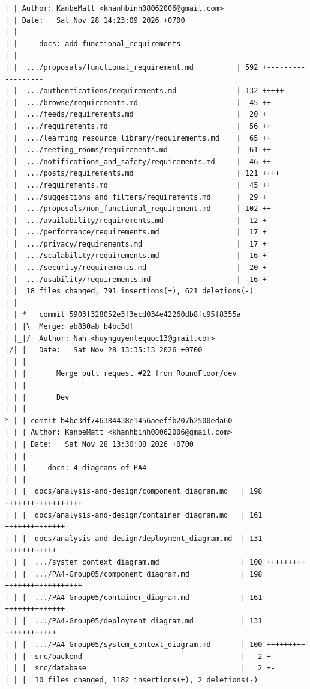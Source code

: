 \documentclass[12pt]{article}
\begin{document}
\begin{lstlisting}[numbers=none,breaklines=true]
| | Author: KanbeMatt <khanhbinh08062006@gmail.com>
| | Date:   Sat Nov 28 14:23:09 2026 +0700
| |
| |     docs: add functional_requirements
| |
| |  .../proposals/functional_requirement.md          | 592 +------------------
| |  .../authentications/requirements.md              | 132 +++++
| |  .../browse/requirements.md                       |  45 ++
| |  .../feeds/requirements.md                        |  20 +
| |  .../requirements.md                              |  56 ++
| |  .../learning_resource_library/requirements.md    |  65 ++
| |  .../meeting_rooms/requirements.md                |  61 ++
| |  .../notifications_and_safety/requirements.md     |  46 ++
| |  .../posts/requirements.md                        | 121 ++++
| |  .../requirements.md                              |  45 ++
| |  .../suggestions_and_filters/requirements.md      |  29 +
| |  .../proposals/non_functional_requirement.md      | 102 ++--
| |  .../availability/requirements.md                 |  12 +
| |  .../performance/requirements.md                  |  17 +
| |  .../privacy/requirements.md                      |  17 +
| |  .../scalability/requirements.md                  |  16 +
| |  .../security/requirements.md                     |  20 +
| |  .../usability/requirements.md                    |  16 +
| |  18 files changed, 791 insertions(+), 621 deletions(-)
| |
| | *   commit 5903f328052e3f3ecd034e42260db8fc95f8355a
| | |\  Merge: ab830ab b4bc3df
| |_|/  Author: Nah <huynguyenlequoc13@gmail.com>
|/| |   Date:   Sat Nov 28 13:35:13 2026 +0700
| | |
| | |       Merge pull request #22 from RoundFloor/dev
| | |
| | |       Dev
| | |
* | | commit b4bc3df746384438e1456aeeffb207b2500eda60
| | | Author: KanbeMatt <khanhbinh08062006@gmail.com>
| | | Date:   Sat Nov 28 13:30:08 2026 +0700
| | |
| | |     docs: 4 diagrams of PA4
| | |
| | |  docs/analysis-and-design/component_diagram.md   | 198 ++++++++++++++++++
| | |  docs/analysis-and-design/container_diagram.md   | 161 ++++++++++++++
| | |  docs/analysis-and-design/deployment_diagram.md  | 131 ++++++++++++
| | |  .../system_context_diagram.md                   | 100 +++++++++
| | |  .../PA4-Group05/component_diagram.md            | 198 ++++++++++++++++++
| | |  .../PA4-Group05/container_diagram.md            | 161 ++++++++++++++
| | |  .../PA4-Group05/deployment_diagram.md           | 131 ++++++++++++
| | |  .../PA4-Group05/system_context_diagram.md       | 100 +++++++++
| | |  src/backend                                     |   2 +-
| | |  src/database                                    |   2 +-
| | |  10 files changed, 1182 insertions(+), 2 deletions(-)

\end{lstlisting}
\end{document}
